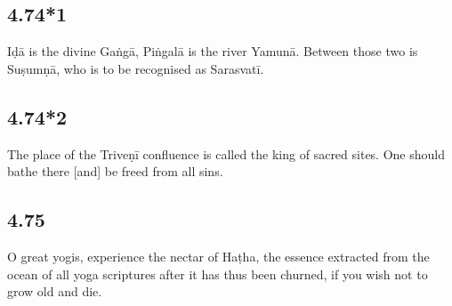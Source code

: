 \begin{ekdosis}
\subsection*{4.74*1}
\begin{translation}[hp04_074_1]
Iḍā is the divine Gaṅgā, Piṅgalā is the river Yamunā. Between those two is Suṣumṇā, who is to be recognised as Sarasvatī.
\end{translation}




\subsection*{4.74*2}
\begin{translation}[hp04_074_2]
The place of the Triveṇī confluence is called the king of sacred sites. One should bathe there [and] be freed from all sins.
\end{translation}




\subsection*{4.75}
\begin{translation}[hp04_075]
O great yogis, experience the nectar of Haṭha, the essence extracted from the ocean of all yoga scriptures after it has thus been churned, if you wish not to grow old and die.
\end{translation} %



\end{ekdosis}
